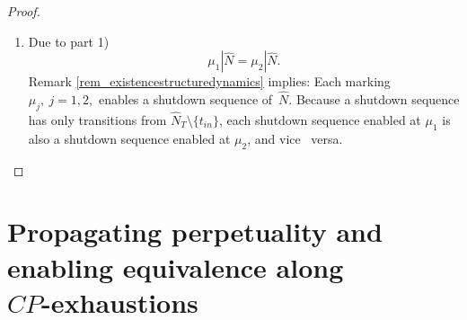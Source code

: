 \documentclass{fundam}
\newcommand{\qed}{}
\begin{document}
\begin{proof}
\begin{enumerate}
\begin{itemize}
\noindent Proposition \ref{prop_cpnetsubnetsperpetual}, part 4), applied to the path $\delta_q$, shows that $t$ is enabled at a reachable marking of
$(\hat{N},\hat{\mu}_2)$. Because $\hat{\mu}_2(p)=0$ Proposition \ref{prop_perpetualtsystem}, part 1) provides a pair
$$(\tau_p,\delta_p) \in en_{sd}(\hat{N},\hat{\mu}_2)_p \text{ with } \Vert \hat{\mu}_2 \Vert_{\delta_p}=0,$$
see Figure \ref{fig_lucent}, middle.

\item \emph{Triple ($\hat{\mu}_1,\tau_p,\delta_p$)}: By enabling equivalence
$$\tau_p \in en(\hat{N},\hat{\mu}_2) \implies \tau_p \in en(\hat{N},\hat{\mu}_1)$$
Figure \ref{fig_lucent}, right-hand side shows $\hat{\mu}_1$. After firing $\hat{\mu}_1 \xrightarrow{\tau_p} \mu^\prime$ the segment
$$\delta^\prime :=(\tau_p,...,p) \text{ of } \delta_p \subset \hat{N}$$
has token count
$$\Vert \mu^\prime \Vert_{\delta^\prime}\geq 2,$$
but due to Proposition \ref{prop_cpnetsubnetsperpetual}, part 2)
$$\Vert \mu^\prime \Vert_{\delta^\prime}\leq 1.$$
The contradiction refutes the assumption of the indirect proof, hence
$$\hat{\mu}_1=\hat{\mu}_2$$
\end{itemize}
\item Due to part 1)
$$\mu_1|\hat{N}=\mu_2|\hat{N}.$$
Remark \ref{rem_existencestructuredynamics} implies: Each marking $\mu_j,\ j=1,2,$ enables a shutdown sequence \mbox{of $\hat{N}$}. Because a shutdown sequence has only transitions from $\hat{N}_T \setminus \{t_{in}\}$, each shutdown sequence enabled at $\mu_1$ is also a shutdown sequence enabled at $\mu_2$, and vice \mbox{ versa.\qed}
\end{enumerate}

\vspace*{-7mm}
\end{proof}

\section{Propagating perpetuality and enabling equivalence along \\ $CP$-exhaustions}\label{sect_propagating}
\end{document}
